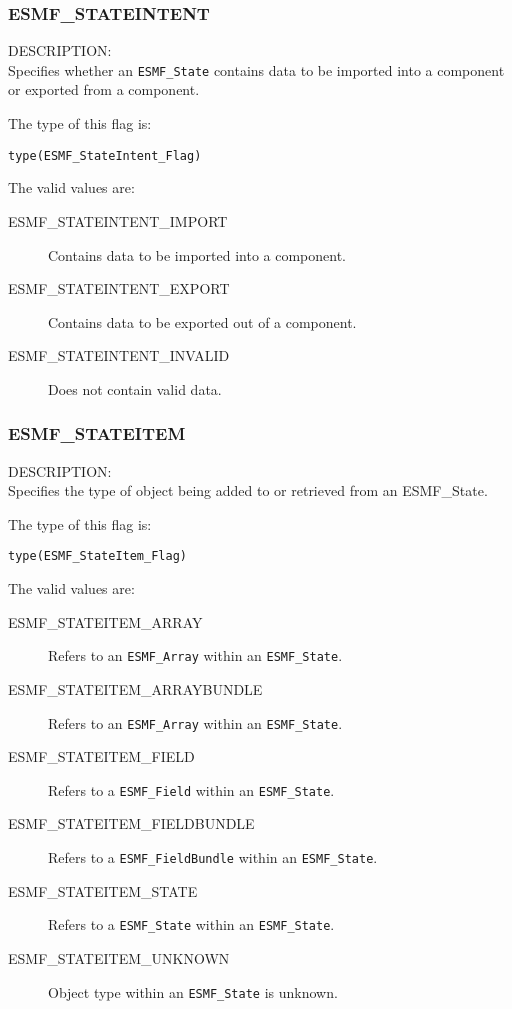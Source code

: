 
\subsubsection{ESMF\_STATEINTENT}
\label{const:stateintent}

{\sf DESCRIPTION:\\}
Specifies whether an {\tt ESMF\_State} contains data to be imported
into a component or exported from a component. 

The type of this flag is:

{\tt type(ESMF\_StateIntent\_Flag)}

The valid values are:
\begin{description}
   \item [ESMF\_STATEINTENT\_IMPORT] 
         Contains data to be imported into a component.
   \item [ESMF\_STATEINTENT\_EXPORT]
         Contains data to be exported out of a component.
   \item [ESMF\_STATEINTENT\_INVALID]
         Does not contain valid data.
\end{description}

\subsubsection{ESMF\_STATEITEM}
\label{const:stateitem}

{\sf DESCRIPTION:\\}
Specifies the type of object being added to or retrieved from an
{ESMF\_State.}

The type of this flag is:

{\tt type(ESMF\_StateItem\_Flag)}

The valid values are:
\begin{description}
   \item [ESMF\_STATEITEM\_ARRAY]
         Refers to an {\tt ESMF\_Array} within an {\tt ESMF\_State}.
   \item [ESMF\_STATEITEM\_ARRAYBUNDLE]
         Refers to an {\tt ESMF\_Array} within an {\tt ESMF\_State}.
   \item [ESMF\_STATEITEM\_FIELD]
         Refers to a {\tt ESMF\_Field} within an {\tt ESMF\_State}.
   \item [ESMF\_STATEITEM\_FIELDBUNDLE] 
         Refers to a {\tt ESMF\_FieldBundle} within an {\tt ESMF\_State}.
   \item [ESMF\_STATEITEM\_STATE]
         Refers to a {\tt ESMF\_State} within an {\tt ESMF\_State}.
   \item [ESMF\_STATEITEM\_UNKNOWN]
         Object type within an {\tt ESMF\_State} is unknown.
\end{description}












